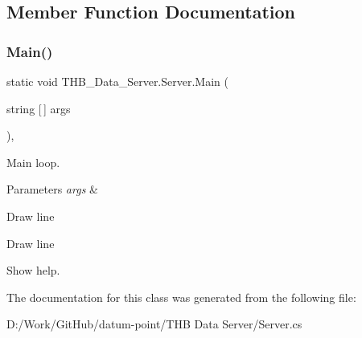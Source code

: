 \subsection{Member Function Documentation}
\mbox{\label{class_t_h_b___data___server_1_1_server_a87515fb7b3422af002d33dd3fbe8f4e9}} 
\subsubsection{\texorpdfstring{Main()}{Main()}}
{\footnotesize\ttfamily static void T\+H\+B\+\_\+\+Data\+\_\+\+Server.\+Server.\+Main (\begin{DoxyParamCaption}\item[{string \mbox{[}$\,$\mbox{]}}]{args }\end{DoxyParamCaption})\hspace{0.3cm}{\ttfamily [static]}, {\ttfamily [private]}}



Main loop. 


\begin{DoxyParams}{Parameters}
{\em args} & \\
\hline
\end{DoxyParams}
Draw line

Draw line

Show help. 

The documentation for this class was generated from the following file\+:\begin{DoxyCompactItemize}
\item 
D\+:/\+Work/\+Git\+Hub/datum-\/point/\+T\+H\+B Data Server/Server.\+cs\end{DoxyCompactItemize}
